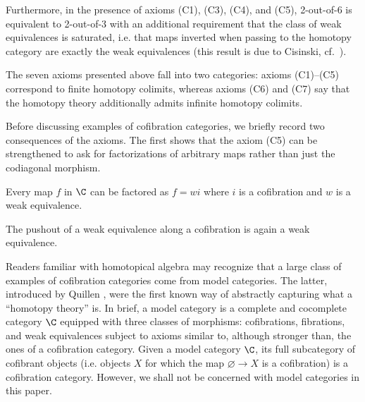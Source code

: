 Furthermore, in the presence of axioms (C1), (C3), (C4), and (C5), 2-out-of-6 is equivalent to 2-out-of-3 with an additional requirement that the class of weak equivalences is saturated, i.e. that maps inverted when passing to the homotopy category are exactly the weak equivalences (this result is due to Cisinski, cf.~\cite[Thm.~7.2.7]{radulescu-banu}).

The seven axioms presented above fall into two categories: axioms (C1)--(C5) correspond to finite homotopy colimits, whereas axioms (C6) and (C7) say that the homotopy theory additionally admits infinite homotopy colimits.

Before discussing examples of cofibration categories, we briefly record two consequences of the axioms.
The first shows that the axiom (C5) can be strengthened to ask for factorizations of arbitrary maps rather than just the codiagonal morphism.

\begin{lemma}
  Every map $f$ in $\C$ can be factored as $f = w i$ where $i$ is a cofibration and $w$ is a weak equivalence.
\end{lemma}

\begin{lemma} \label{left-properness}
  The pushout of a weak equivalence along a cofibration is again a weak equivalence.
\end{lemma}

Readers familiar with homotopical algebra may recognize that a large class of examples of cofibration categories come from model categories.
The latter, introduced by Quillen \cite{quillen:book}, were the first known way of abstractly capturing what a ``homotopy theory'' is.
In brief, a model category is a complete and cocomplete category $\C$ equipped with three classes of morphisms: cofibrations, fibrations, and weak equivalences subject to axioms similar to, although stronger than, the ones of a cofibration category.
Given a model category $\C$, its full subcategory of cofibrant objects (i.e. objects $X$ for which the map $\varnothing \to X$ is a cofibration) is a cofibration category.
However, we shall not be concerned with model categories in this paper.

